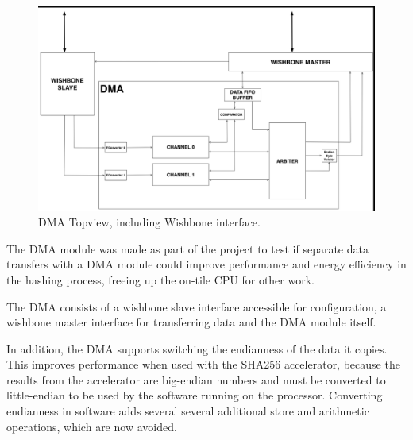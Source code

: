 \begin{figure}[htb]
    \centering
    \includegraphics[width=1.0\textwidth]{Figures/DMA/DMATopview}
    \caption{DMA Topview, including Wishbone interface.}
    \label{fig:DMATop}
\end{figure}

The DMA module was made as part of the project to test if separate data transfers with a DMA module could improve performance and energy efficiency in the hashing process, freeing up the on-tile CPU for other work.

The DMA consists of a wishbone slave interface accessible for configuration, a wishbone master
interface for transferring data and the DMA module itself.


In addition, the DMA supports switching the endianness of the data it copies. This improves performance
when used with the SHA256 accelerator, because the results from the accelerator are big-endian numbers
and must be converted to little-endian to be used by the software running on the processor. Converting
endianness in software adds several several additional store and arithmetic operations, which are now avoided.

